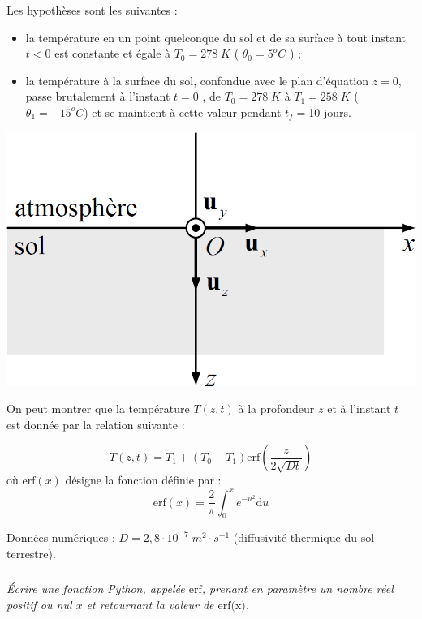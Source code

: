 \documentclass[10pt,oneside]{article}
\begin{document}
\begin{minipage}[c]{.6\linewidth}
Les hypothèses sont les suivantes :
\begin{itemize}
\item la température en un point quelconque du sol et de sa surface à tout instant $t < 0$ est constante et égale à $T_0=278\;K$ ( $\theta_0=5^oC$ ) ;
\item la température à la surface du sol, confondue avec le plan d’équation $z = 0$, passe brutalement à l’instant $t = 0$ , de $T_0 = 278\;K$ à $T_1 =  258\; K$ ($\theta_1 = -15^o C$) et se maintient à cette valeur pendant
$t_f= $10 jours.
\end{itemize}
\end{minipage}\hfill
\begin{minipage}[c]{.35\linewidth}
\begin{center}
\includegraphics[width=.95\textwidth]{images/canalisation}
\end{center}
\end{minipage}

On peut montrer que la température $T(z, t)$ à la profondeur $z$ et à l’instant $t$ est donnée par la relation suivante :

$$
T(z,t)=T_1 + (T_0-T_1) \text{erf}\left( \dfrac{z}{2\sqrt{Dt}} \right)
$$
où $\text{erf}(x)$ désigne la fonction définie par :
$$
\text{erf}(x) = \dfrac{2}{\pi}\int^x_0 e^{-u^2} \mathrm{d}u
$$

Données numériques : $D=2,8\cdot 10^{-7} \; m^2\cdot s^{-1}$ (diffusivité thermique du sol terrestre).

\setcounter{subparagraph}{0}
\subparagraph{}
\textit{Écrire une fonction Python, appelée $\text{erf}$, prenant en paramètre un nombre réel positif ou nul $x$ et
retournant la valeur de $\text{erf(x)}$.}
\end{document}
